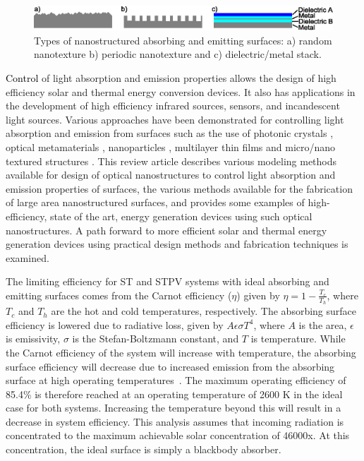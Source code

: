 \documentclass[review]{elsarticle}
\begin{document}
\begin{figure}[ht!]
	\includegraphics[width=1\textwidth]{gfig_surfs}
	\caption{\label{gfig_surfs} Types of nanostructured absorbing and 
emitting surfaces: a) random nanotexture b) periodic nanotexture and c) dielectric/metal stack.} 
\end{figure}

\textcolor{black}{Control} of light absorption and emission properties allows the design of high efficiency solar and thermal energy conversion devices. It also has applications in the development of high efficiency infrared sources, sensors, and incandescent light sources. Various approaches have been demonstrated for controlling light absorption and emission from surfaces such as the use of photonic crystals \cite{g11,NYL_SEMSC_2014,g13,g14}, optical metamaterials \cite{g15,g16,g17}, nanoparticles \cite{g18,g19,g20,g21}, multilayer thin films \cite{g22,RF_OptExp_2009} and micro/nano textured structures \cite{g25,g26,g27,g28}.  This review article describes various modeling methods available for design of optical nanostructures to control light absorption and emission properties of surfaces, the various methods available for the fabrication of large area nanostructured surfaces, and provides some examples of high-efficiency, state of the art, energy generation devices using such optical nanostructures.  A path forward to more efficient solar and thermal energy generation devices using practical design methods and fabrication techniques is examined.

The limiting efficiency for ST and STPV systems with ideal absorbing and
emitting surfaces comes from the Carnot efficiency ($\eta$) given by $\eta
= 1 - \frac{T_c}{T_h}$, where $T_c$ and $T_h$ are the hot and cold
temperatures, respectively. The absorbing surface efficiency is lowered
due to radiative loss, given by $ A \epsilon \sigma T^4$, where $A$ is the
area, $\epsilon$ is emissivity, $\sigma$ is the Stefan-Boltzmann constant,
and $T$ is temperature.  While the Carnot efficiency of the system will
increase with temperature, the absorbing surface efficiency will decrease
due to increased emission from the absorbing surface at high operating
temperatures~\cite{L_AIP_2007}.  The maximum operating efficiency of
85.4\% is therefore reached at an operating temperature of 2600 K in the
ideal case for both systems.  Increasing the temperature beyond this will
result in a decrease in system efficiency.  This analysis assumes that
incoming radiation is concentrated to the maximum achievable solar
concentration of 46000x.  At this concentration, the ideal surface is
simply a blackbody absorber.
\end{document}
